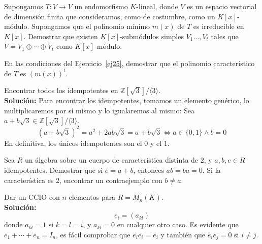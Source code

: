 \begin{ejerciciostarstar}\label{ej25}
    Supongamos $T:V\to V$ un endomorfismo $K$-lineal, donde $V$ es un espacio vectorial de dimensión finita que consideramos, como de costumbre, como un $K[x]$-módulo. Supongamos que el polinomio mínimo $m(x)$ de $T$ es irreducible en $K[x]$. Demostrar que existen $K[x]$-submódulos simples $V_1\ldots, V_t$ tales que $V = V_1\oplus \cdots\oplus V_t$ como $K[x]$-módulo.
\end{ejerciciostarstar}

\begin{ejerciciostarstar}
    En las condiciones del Ejercicio~\ref{ej25}, demostrar que el polinomio característico de $T$ es ${(m(x))}^{t}$. 
\end{ejerciciostarstar}

\begin{ejercicio}
    Encontrar todos los idempotentes en $\mathbb{Z}[\sqrt{3}]/\langle 3 \rangle $. \\
    
    \noindent
    \textbf{Solución:}
    Para encontrar los idempotentes, tomamos un elemento genérico, lo multiplicaremos por sí mismo y lo igualaremos al mismo:
    Sea $a+b\sqrt{3} \in \mathbb{Z}[\sqrt{3}]/\langle 3 \rangle $.
    \begin{equation*}
        (a+b\sqrt{3})^{2} = a^2 + 2ab\sqrt{3} = a + b\sqrt{3} \Longleftrightarrow a \in \{0,1\} \land b = 0
    \end{equation*}
    En definitiva,  los únicos idempotentes son el $0$ y el $1$.
\end{ejercicio}

\begin{ejerciciostarstar}
    Sea $R$ un álgebra sobre un cuerpo de característica distinta de 2, y $a,b,e \in R$ idempotentes. Demostrar que si $e=a+b$, entonces $ab=ba=0$. Si la característica es 2, encontrar un contraejemplo con $b\neq a$. 
\end{ejerciciostarstar}

\begin{ejercicio}
    Dar un CCIO con $n$ elementos para $R=M_n(K)$. \\
    
    \noindent
    \textbf{Solución:}
    \begin{equation*}
        e_i = (a_{kl})
    \end{equation*}
    donde $a_{kl} = 1$ si $k=l=i $, y $a_{kl}=0$ en cualquier otro caso. Es evidente que $e_1 + \cdots + e_n = I_n$, es fácil comprobar que $e_i e_i = e_i $ y también que $e_ie_j = 0$ si $i \neq j$. 
\end{ejercicio}

